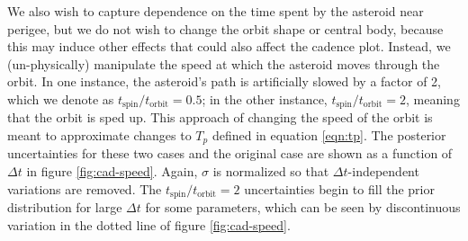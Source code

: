 \documentclass[fleqn,usenatbib]{mnras}
\begin{document}
We also wish to capture dependence on the time spent by the asteroid near perigee, but we do not wish to change the orbit shape or central body, because this may induce other effects that could also affect the cadence plot. Instead, we (un-physically) manipulate the speed at which the asteroid moves through the orbit. In one instance, the asteroid's path is artificially slowed by a factor of 2, which we denote as $t_\text{spin}/t_\text{orbit}=0.5$; in the other instance, $t_\text{spin}/t_\text{orbit}=2$, meaning that the orbit is sped up. This approach of changing the speed of the orbit is meant to approximate changes to $T_p$ defined in equation \ref{eqn:tp}. The posterior uncertainties for these two cases and the original case are shown as a function of $\Delta t$ in figure \ref{fig:cad-speed}. Again, $\sigma$ is normalized so that $\Delta t$-independent variations are removed. The $t_\text{spin}/t_\text{orbit}=2$ uncertainties begin to fill the prior distribution for large $\Delta t$ for some parameters, which can be seen by discontinuous variation in the dotted line of figure \ref{fig:cad-speed}.
\end{document}
